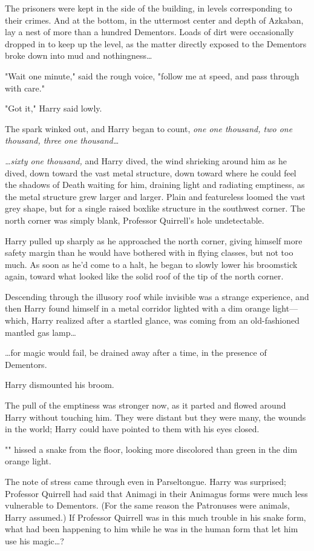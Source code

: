The prisoners were kept in the side of the building, in levels corresponding to 
their crimes. And at the bottom, in the uttermost center and depth of Azkaban, 
lay a nest of more than a hundred Dementors. Loads of dirt were occasionally 
dropped in to keep up the level, as the matter directly exposed to the 
Dementors broke down into mud and nothingness{\ldots}

"Wait one minute," said the rough voice, "follow me at speed, and pass through 
with care."

"Got it," Harry said lowly.

The spark winked out, and Harry began to count, \emph{one one thousand, two one 
thousand, three one thousand{\ldots}}

\emph{{\ldots}sixty one thousand,} and Harry dived, the wind shrieking around 
him as he dived, down toward the vast metal structure, down toward where he 
could feel the shadows of Death waiting for him, draining light and radiating 
emptiness, as the metal structure grew larger and larger. Plain and featureless 
loomed the vast grey shape, but for a single raised boxlike structure in the 
southwest corner. The north corner was simply blank, Professor Quirrell's hole 
undetectable.

Harry pulled up sharply as he approached the north corner, giving himself more 
safety margin than he would have bothered with in flying classes, but not too 
much. As soon as he'd come to a halt, he began to slowly lower his broomstick 
again, toward what looked like the solid roof of the tip of the north corner.

Descending through the illusory roof while invisible was a strange experience, 
and then Harry found himself in a metal corridor lighted with a dim orange 
light---which, Harry realized after a startled glance, was coming from an 
old-fashioned mantled gas lamp{\ldots}

{\ldots}for magic would fail, be drained away after a time, in the presence of 
Dementors.

Harry dismounted his broom.

The pull of the emptiness was stronger now, as it parted and flowed around 
Harry without touching him. They were distant but they were many, the wounds in 
the world; Harry could have pointed to them with his eyes closed.

"" hissed a snake from the floor, looking more 
discolored than green in the dim orange light.

The note of stress came through even in Parseltongue. Harry was surprised; 
Professor Quirrell had said that Animagi in their Animagus forms were much less 
vulnerable to Dementors. (For the same reason the Patronuses were animals, 
Harry assumed.) If Professor Quirrell was in this much trouble in his snake 
form, what had been happening to him while he was in the human form that let 
him use his magic{\ldots}?

